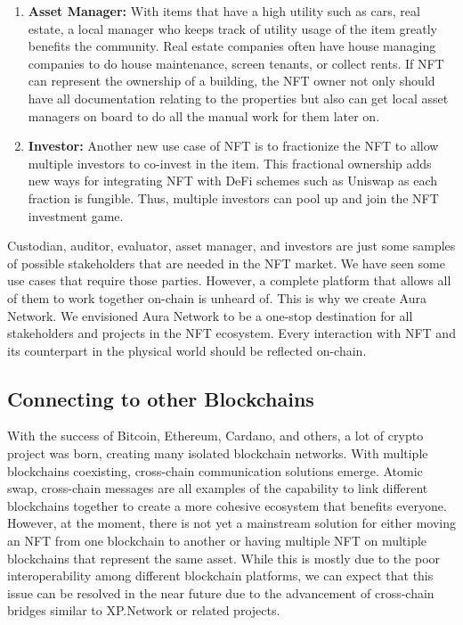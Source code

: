 \documentclass[12pt, titlepage]{article}
\begin{document}
\begin{enumerate}
    \item \textbf{Asset Manager:} With items that have a high utility such as cars, real estate, a local manager who keeps track of utility usage of the item greatly benefits the community. Real estate companies often have house managing companies to do house maintenance, screen tenants, or collect rents. If NFT can represent the ownership of a building, the NFT owner not only should have all documentation relating to the properties but also can get local asset managers on board to do all the manual work for them later on. 
    
    \item \textbf{Investor:} Another new use case of NFT is to fractionize the NFT to allow multiple investors to co-invest in the item. This fractional ownership adds new ways for integrating NFT with DeFi schemes such as Uniswap as each fraction is fungible. Thus, multiple investors can pool up and join the NFT investment game.
\end{enumerate}

Custodian, auditor, evaluator, asset manager, and investors are just some samples of possible stakeholders that are needed in the NFT market. We have seen some use cases that require those parties. However, a complete platform that allows all of them to work together on-chain is unheard of. This is why we create Aura Network. We envisioned Aura Network to be a one-stop destination for all stakeholders and projects in the NFT ecosystem. Every interaction with NFT and its counterpart in the physical world should be reflected on-chain.

\subsection{Connecting to other Blockchains}

With the success of Bitcoin, Ethereum, Cardano, and others, a lot of crypto project was born, creating many isolated blockchain networks. With multiple blockchains coexisting, cross-chain communication solutions emerge. Atomic swap, cross-chain messages are all examples of the capability to link different blockchains together to create a more cohesive ecosystem that benefits everyone. However, at the moment, there is not yet a mainstream solution for either moving an NFT from one blockchain to another or having multiple NFT on multiple blockchains that represent the same asset. While this is mostly due to the poor interoperability among different blockchain platforms, we can expect that this issue can be resolved in the near future due to the advancement of cross-chain bridges similar to XP.Network \cite{xpnetwork} or related projects. 
\end{document}
